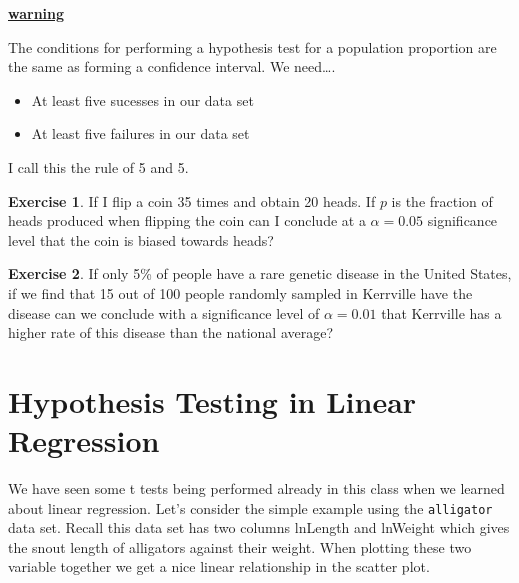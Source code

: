 \documentclass[
]{book}
\newenvironment{Shaded}{\begin{snugshade}}{\end{snugshade}}
\newcommand{\AttributeTok}[1]{\textcolor[rgb]{0.77,0.63,0.00}{#1}}
\newcommand{\FunctionTok}[1]{\textcolor[rgb]{0.00,0.00,0.00}{#1}}
\newcommand{\NormalTok}[1]{#1}
\newcommand{\SpecialCharTok}[1]{\textcolor[rgb]{0.00,0.00,0.00}{#1}}
\newcommand{\StringTok}[1]{\textcolor[rgb]{0.31,0.60,0.02}{#1}}
\providecommand{\tightlist}{%
  \setlength{\itemsep}{0pt}\setlength{\parskip}{0pt}}
\newenvironment{rmdblock}[1]
  {\begin{shaded*}
  \centerline{\underline{\textbf{#1}}}

  }
  {
  \end{shaded*}
  }
\newenvironment{warning}
  {\begin{rmdblock}{warning}}
  {\end{rmdblock}}
\theoremstyle{definition}
\theoremstyle{definition}
\theoremstyle{definition}
\newtheorem{exercise}{Exercise}[chapter]
\theoremstyle{definition}
\theoremstyle{remark}
\begin{document}
\begin{warning}
The conditions for performing a hypothesis test for a population proportion are the same as forming a confidence interval. We need\ldots.

\begin{itemize}
\tightlist
\item
  At least five sucesses in our data set
\item
  At least five failures in our data set
\end{itemize}

I call this the rule of 5 and 5.
\end{warning}

\begin{exercise}
\protect\hypertarget{exr:unnamed-chunk-537}{}\label{exr:unnamed-chunk-537}If I flip a coin 35 times and obtain 20 heads. If \(p\) is the fraction of heads produced when flipping the coin can I conclude at a \(\alpha=0.05\) significance level that the coin is biased towards heads?
\end{exercise}

\begin{exercise}
\protect\hypertarget{exr:unnamed-chunk-538}{}\label{exr:unnamed-chunk-538}If only 5\% of people have a rare genetic disease in the United States, if we find that 15 out of 100 people randomly sampled in Kerrville have the disease can we conclude with a significance level of \(\alpha=0.01\) that Kerrville has a higher rate of this disease than the national average?
\end{exercise}

\hypertarget{hypothesis-testing-in-linear-regression}{%
\section{Hypothesis Testing in Linear Regression}\label{hypothesis-testing-in-linear-regression}}

We have seen some t tests being performed already in this class when we learned about linear regression. Let's consider the simple example using the \texttt{alligator} data set. Recall this data set has two columns lnLength and lnWeight which gives the snout length of alligators against their weight. When plotting these two variable together we get a nice linear relationship in the scatter plot.

\begin{Shaded}
\end{Shaded}
\end{document}
